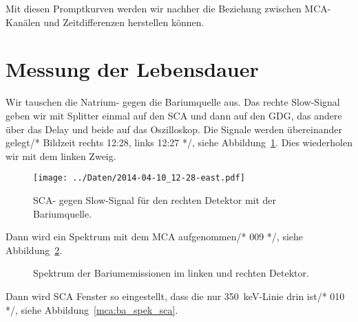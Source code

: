 Mit diesen Promptkurven werden wir nachher die Beziehung zwischen MCA-Kanälen
und Zeitdifferenzen herstellen können.

\section{Messung der Lebensdauer}

Wir tauschen die Natrium- gegen die Bariumquelle aus. Das rechte Slow-Signal
geben wir mit Splitter einmal auf den SCA und dann auf den GDG, das andere über
das Delay und beide auf das Oszilloskop. Die Signale werden übereinander
gelegt/* Bildzeit rechts 12:28, links 12:27 */, siehe
Abbildung~\ref{fig:eine_pulshoehe_ba}. Dies wiederholen wir mit dem linken
Zweig.

\begin{figure}[htbp]
    \centering
    \hfill
    \texttt{[image: ../Daten/2014-04-10\_12-28-east.pdf]}
    \caption{%
        SCA- gegen Slow-Signal für den rechten Detektor mit der Bariumquelle.
    }
    \label{fig:eine_pulshoehe_ba}
\end{figure}

Dann wird ein Spektrum mit dem MCA aufgenommen/* 009 */, siehe Abbildung~\ref{mca:ba_spek}.

\begin{figure}[htbp]
    \centering
    \hfill
    \caption{%
        Spektrum der Bariumemissionen im linken und rechten Detektor.
    }
    \label{mca:ba_spek}
\end{figure}

Dann wird SCA Fenster so eingestellt, dass die nur
\SI{350}{\kilo\electronvolt}-Linie drin ist/* 010 */, siehe
Abbildung~\ref{mca:ba_spek_sca}.

